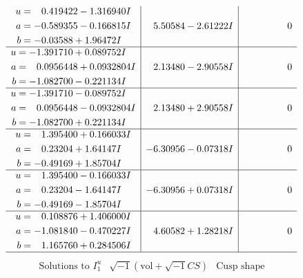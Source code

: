\documentclass[1p]{elsarticle_modified}
\theoremstyle{definition}
\newcommand{\I}{\sqrt{-1}}
\begin{document}
$$\begin{array}{c|c|c}
\begin{aligned}
u &= \phantom{-}0.419422 - 1.316940 I \\
a &= -0.589355 - 0.166815 I \\
b &= -0.03588 + 1.96472 I\end{aligned}
 & \phantom{-}5.50584 - 2.61222 I & \phantom{-0.000000 } 0 \\ \hline\begin{aligned}
u &= -1.391710 + 0.089752 I \\
a &= \phantom{-}0.0956448 + 0.0932804 I \\
b &= -1.082700 - 0.221134 I\end{aligned}
 & \phantom{-}2.13480 - 2.90558 I & \phantom{-0.000000 } 0 \\ \hline\begin{aligned}
u &= -1.391710 - 0.089752 I \\
a &= \phantom{-}0.0956448 - 0.0932804 I \\
b &= -1.082700 + 0.221134 I\end{aligned}
 & \phantom{-}2.13480 + 2.90558 I & \phantom{-0.000000 } 0 \\ \hline\begin{aligned}
u &= \phantom{-}1.395400 + 0.166033 I \\
a &= \phantom{-}0.23204 + 1.64147 I \\
b &= -0.49169 + 1.85704 I\end{aligned}
 & -6.30956 - 0.07318 I & \phantom{-0.000000 } 0 \\ \hline\begin{aligned}
u &= \phantom{-}1.395400 - 0.166033 I \\
a &= \phantom{-}0.23204 - 1.64147 I \\
b &= -0.49169 - 1.85704 I\end{aligned}
 & -6.30956 + 0.07318 I & \phantom{-0.000000 } 0 \\ \hline\begin{aligned}
u &= \phantom{-}0.108876 + 1.406000 I \\
a &= -1.081840 - 0.470227 I \\
b &= \phantom{-}1.165760 + 0.284506 I\end{aligned}
 & \phantom{-}4.60582 + 1.28218 I & \phantom{-0.000000 } 0\\
 \hline 
 \end{array}$$\newpage$$\begin{array}{c|c|c}  
\text{Solutions to }I^u_{1}& \I (\text{vol} + \sqrt{-1}CS) & \text{Cusp shape}\\
 \hline 
\begin{aligned}

\end{aligned}
\end{array}$$
\end{document}
